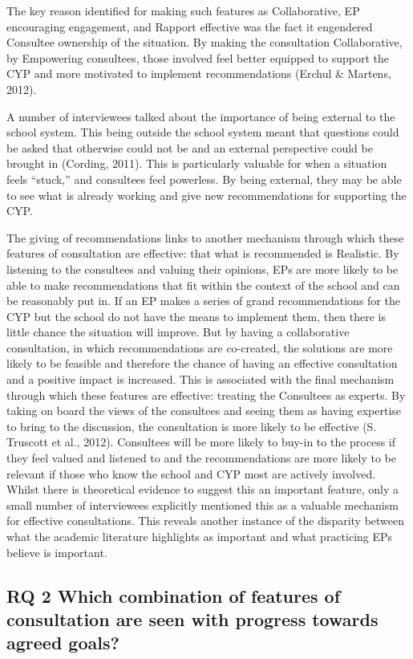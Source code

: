\documentclass[
  english,
  man,floatsintext]{apa6}
\begin{document}
The key reason identified for making such features as Collaborative, EP
encouraging engagement, and Rapport effective was the fact it engendered Consultee
ownership of the situation. By making the consultation Collaborative, by
Empowering consultees, those involved feel better equipped to support
the CYP and more motivated to implement recommendations
(Erchul \& Martens, 2012).

A number of interviewees talked about the importance of being external
to the school system. This being outside the school system meant that
questions could be asked that otherwise could not be and an external
perspective could be brought in
(Cording, 2011). This is particularly
valuable for when a situation feels ``stuck,'' and consultees feel
powerless. By being external, they may be able to see what is already
working and give new recommendations for supporting the CYP.

The giving of recommendations links to another mechanism through which
these features of consultation are effective: that what is recommended
is Realistic. By listening to the consultees and valuing their opinions,
EPs are more likely to be able to make recommendations that fit within
the context of the school and can be reasonably put in. If an EP makes a
series of grand recommendations for the CYP but the school do not have
the means to implement them, then there is little chance the situation
will improve. But by having a collaborative consultation, in which
recommendations are co-created, the solutions are more likely to be
feasible and therefore the chance of having an effective consultation
and a positive impact is increased. This is associated with the final
mechanism through which these features are effective: treating the
Consultees as experts. By taking on board the views of the consultees
and seeing them as having expertise to bring to the discussion, the
consultation is more likely to be effective
(S. Truscott et al., 2012). Consultees will be more likely
to buy-in to the process if they feel valued and listened to and the
recommendations are more likely to be relevant if those who know the
school and CYP most are actively involved. Whilst there is theoretical evidence to suggest this an important feature, only a small number of interviewees explicitly
mentioned this as a valuable mechanism for effective consultations. This reveals another instance of the disparity between what the academic literature highlights as important and what practicing EPs believe is important.

\hypertarget{rq-2-which-combination-of-features-of-consultation-are-seen-with-progress-towards-agreed-goals}{%
\subsection{RQ 2 Which combination of features of consultation are seen with progress towards agreed goals?}\label{rq-2-which-combination-of-features-of-consultation-are-seen-with-progress-towards-agreed-goals}}
\end{document}
